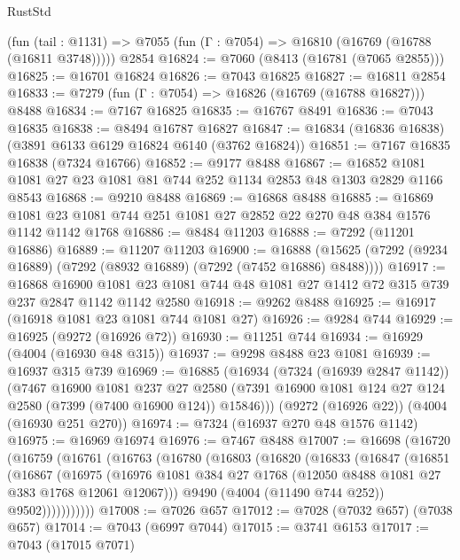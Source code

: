 \begin{lexlean}{RustStd}
\begin{coremodule}
    (fun (tail : @1131) => @7055 (fun (Γ : @7054) => @16810 (@16769 (@16788 (@16811 @3748)))))
    @2854
@16824 := @7060 (@8413 (@16781 (@7065 @2855)))
@16825 := @16701 @16824
@16826 := @7043 @16825
@16827 := @16811 @2854
@16833 := @7279 (fun (Γ : @7054) => @16826 (@16769 (@16788 @16827))) @8488
@16834 := @7167 @16825
@16835 := @16767 @8491
@16836 := @7043 @16835
@16838 := @8494 @16787 @16827
@16847 := @16834 (@16836 @16838) (@3891 @6133 @6129 @16824 @6140 (@3762 @16824))
@16851 := @7167 @16835 @16838 (@7324 @16766)
@16852 := @9177 @8488
@16867 := @16852 @1081 @1081 @27 @23 @1081 @81 @744 @252 @1134 @2853 @48 @1303 @2829 @1166 @8543
@16868 := @9210 @8488
@16869 := @16868 @8488
@16885 := @16869 @1081 @23 @1081 @744 @251 @1081 @27 @2852 @22 @270 @48 @384 @1576 @1142 @1142 @1768
@16886 := @8484 @11203
@16888 := @7292 (@11201 @16886)
@16889 := @11207 @11203
@16900 := @16888 (@15625 (@7292 (@9234 @16889) (@7292 (@8932 @16889) (@7292 (@7452 @16886) @8488))))
@16917 := @16868
    @16900
    @1081
    @23
    @1081
    @744
    @48
    @1081
    @27
    @1412
    @72
    @315
    @739
    @237
    @2847
    @1142
    @1142
    @2580
@16918 := @9262 @8488
@16925 := @16917 (@16918 @1081 @23 @1081 @744 @1081 @27)
@16926 := @9284 @744
@16929 := @16925 (@9272 (@16926 @72))
@16930 := @11251 @744
@16934 := @16929 (@4004 (@16930 @48 @315))
@16937 := @9298 @8488 @23 @1081
@16939 := @16937 @315 @739
@16969 := @16885
    (@16934
      (@7324 (@16939 @2847 @1142))
      (@7467
        @16900
        @1081
        @237
        @27
        @2580
        (@7391 @16900 @1081 @124 @27 @124 @2580 (@7399 (@7400 @16900 @124)) @15846)))
    (@9272 (@16926 @22))
    (@4004 (@16930 @251 @270))
@16974 := @7324 (@16937 @270 @48 @1576 @1142)
@16975 := @16969 @16974
@16976 := @7467 @8488
@17007 := @16698
    (@16720
      (@16759
        (@16761
          (@16763
            (@16780
              (@16803
                (@16820
                  (@16833
                    (@16847
                      (@16851
                        (@16867
                          (@16975
                            (@16976
                              @1081
                              @384
                              @27
                              @1768
                              (@12050 @8488 @1081 @27 @383 @1768 @12061 @12067)))
                          @9490
                          (@4004 (@11490 @744 @252))
                          @9502)))))))))))
@17008 := @7026 @657
@17012 := @7028 (@7032 @657) (@7038 @657)
@17014 := @7043 (@6997 @7044)
@17015 := @3741 @6153
@17017 := @7043 (@17015 @7071)

\end{coremodule}
\end{lexlean}
